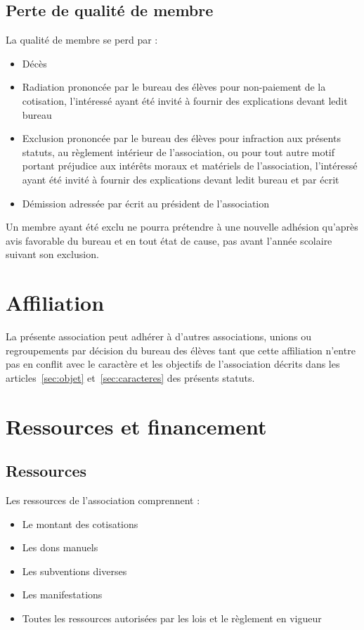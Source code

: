 \documentclass{article}
\begin{document}
		\subsection{Perte de qualité de membre}
		\label{ssec:perte_qualite_membre}
			La qualité de membre se perd par :
			\begin{itemize}
				\item Décès
				\item Radiation prononcée par le bureau des élèves pour
					non-paiement de la cotisation, l'intéressé ayant été invité
					à fournir des explications devant ledit bureau
				\item Exclusion prononcée par le bureau des élèves pour
					infraction aux présents statuts, au règlement intérieur de
					l'association, ou pour tout autre motif portant préjudice
					aux intérêts moraux et matériels de l’association,
					l'intéressé ayant été invité à fournir des explications
					devant ledit bureau et par écrit
				\item Démission adressée par écrit au président de l’association
			\end{itemize}

			Un membre ayant été exclu ne pourra prétendre à une nouvelle
			adhésion qu’après avis favorable du bureau et en tout état de cause,
			pas avant l’année scolaire suivant son exclusion.

	\section{Affiliation}
		La présente association peut adhérer à d’autres associations, unions ou
		regroupements par décision du bureau des élèves tant que cette
		affiliation n’entre pas en conflit avec le caractère et les objectifs de
		l’association décrits dans les articles~\ref{sec:objet}
		et~\ref{sec:caracteres} des présents statuts.

	\section{Ressources et financement}
		\subsection{Ressources}
			Les ressources de l’association comprennent :
			\begin{itemize}
				\item Le montant des cotisations
				\item Les dons manuels
				\item Les subventions diverses
				\item Les manifestations
				\item Toutes les ressources autorisées par les lois et le
					règlement en vigueur
			\end{itemize}
\end{document}

